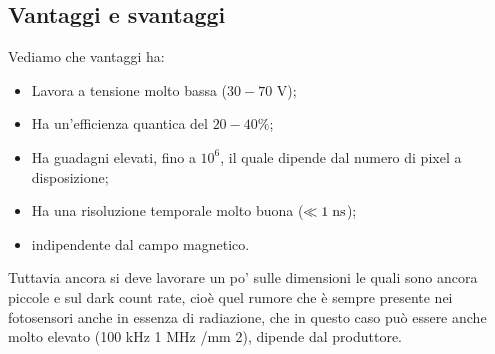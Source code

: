 \subsection{Vantaggi e svantaggi}
Vediamo che vantaggi ha:
\begin{itemize}[leftmargin=0.5cm]
   \item Lavora a tensione molto bassa ($30-70$ V);
   \item Ha un'efficienza quantica del $20-40\%$;
   \item Ha guadagni elevati, fino a $10^6$, il quale dipende dal numero di pixel a disposizione;
   \item Ha una risoluzione temporale molto buona ($\ll 1 \; \rm ns$);
   \item \E indipendente dal campo magnetico.
\end{itemize}
Tuttavia ancora si deve lavorare un po' sulle dimensioni le quali sono ancora piccole e sul dark count rate, cioè quel rumore che è sempre presente nei fotosensori anche in essenza di radiazione, che in questo caso può essere anche molto elevato (100 kHz 1 MHz /mm 2), dipende dal produttore.

